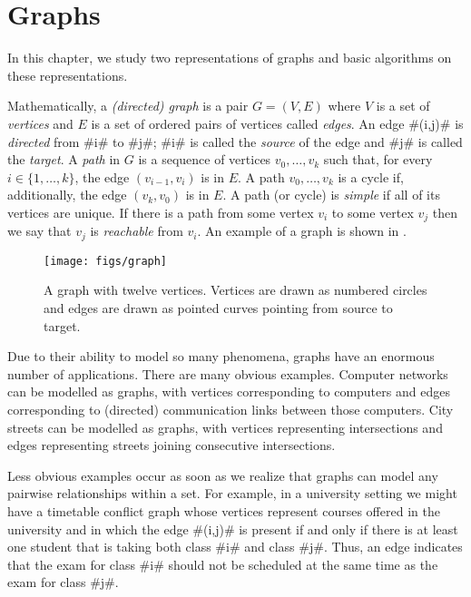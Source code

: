 \chapter{Graphs}


In this chapter, we study two representations of graphs and basic
algorithms on these representations.  

Mathematically, a \emph{(directed) graph} is a pair $G=(V,E)$ where
$V$ is a set of \emph{vertices} and $E$ is a set of ordered pairs
of vertices called \emph{edges}.  An edge #(i,j)# is \emph{directed}
from #i# to #j#;  #i# is called the \emph{source} of the edge and #j#
is called the \emph{target}.  A \emph{path} in $G$ is a sequence of
vertices $v_0,\ldots,v_k$ such that, for every $i\in\{1,\ldots,k\}$,
the edge $(v_{i-1},v_{i})$ is in $E$.  A path $v_0,\ldots,v_k$ is a
cycle if, additionally, the edge $(v_k,v_0)$ is in $E$.  A path (or
cycle) is \emph{simple} if all of its vertices are unique.  If there
is a path from some vertex $v_i$ to some vertex $v_j$ then we say that
$v_j$ is \emph{reachable} from $v_i$.  An example of a graph is shown
in .

\begin{figure}
  \begin{center}
    \texttt{[image: figs/graph]}
  \end{center}
  \caption{A graph with twelve vertices.  Vertices are drawn as numbered
    circles and edges are drawn as pointed curves pointing from source
    to target.}
\end{figure}

Due to their ability to model so many phenomena, graphs have an enormous
number of applications. There are many obvious examples. Computer
networks can be modelled as graphs, with vertices corresponding to
computers and edges corresponding to (directed) communication links
between those computers.  City streets can be modelled as graphs,
with vertices representing intersections and edges representing streets
joining consecutive intersections.

Less obvious examples occur as soon as we realize that graphs can model
any pairwise relationships within a set. For example, in a university
setting we might have a timetable conflict graph whose vertices represent
courses offered in the university and in which the edge #(i,j)# is present
if and only if there is at least one student that is taking both class
#i# and class #j#.  Thus, an edge indicates that the exam for class #i#
should not be scheduled at the same time as the exam for class #j#.


